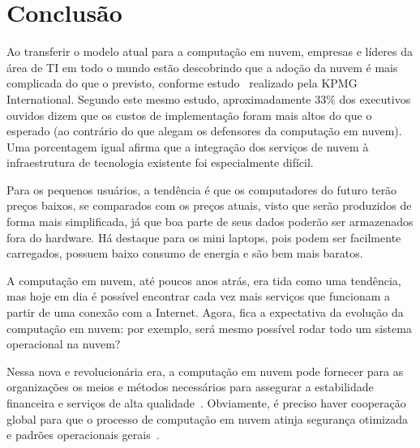 \section{Conclusão}

Ao transferir o modelo atual para a computação em nuvem, empresas e líderes da área 
de TI em todo o mundo estão descobrindo que a adoção da nuvem é mais complicada do 
que o previsto, conforme estudo~\cite{kmpg-cloud-takes-shape} realizado pela KPMG 
International. Segundo este mesmo estudo, aproximadamente 33\% dos executivos ouvidos
dizem que os custos de implementação foram mais altos do que o esperado (ao contrário
do que alegam os defensores da computação em nuvem). Uma porcentagem igual afirma que
a integração dos serviços de nuvem à infraestrutura de tecnologia existente foi
especialmente difícil.

Para os pequenos usuários, a tendência é que os computadores do futuro terão preços
baixos, se comparados com os preços atuais, visto que serão produzidos de forma mais
simplificada, já que boa parte de seus dados poderão ser armazenados fora do
hardware. Há destaque para os mini laptops, pois podem ser facilmente carregados,
possuem baixo consumo de energia e são bem mais baratos.

A computação em nuvem, até poucos anos atrás, era tida como uma tendência, mas hoje
em dia é possível encontrar cada vez mais serviços que funcionam a partir de uma
conexão com a Internet. Agora, fica a expectativa da evolução da computação em nuvem:
por exemplo, será mesmo possível rodar todo um sistema operacional na nuvem? 

Nessa nova e revolucionária era, a computação em nuvem pode fornecer para as 
organizações os meios e métodos necessários para assegurar a estabilidade financeira 
e serviços de alta qualidade~\cite{cloud-computing-fundamentals}. Obviamente, é 
preciso haver cooperação global para que o processo de computação em nuvem atinja 
segurança otimizada e padrões operacionais 
gerais~\cite{cloud-computing-fundamentals}. 
